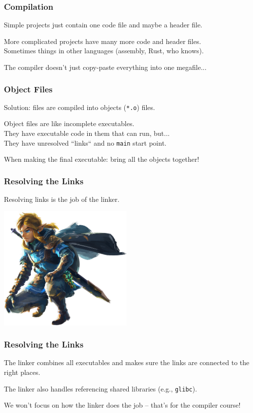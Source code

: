 \begin{frame}
\frametitle{Compilation}

Simple projects just contain one code file and maybe a header file.

More complicated projects have many more code and header files.\\
\quad Sometimes things in other languages (assembly, Rust, who knows).

The compiler doesn't just copy-paste everything into one megafile...

\end{frame}

\begin{frame}
\frametitle{Object Files}

Solution: files are compiled into objects (\texttt{*.o}) files.

Object files are like incomplete executables.\\
\quad They have executable code in them that can run, but...\\
\quad They have unresolved ``links`` and no \texttt{main} start point.

When making the final executable: bring all the objects together!

\end{frame}

\begin{frame}
\frametitle{Resolving the Links}

Resolving links is the job of the \alert{linker}.

\begin{center}
  \includegraphics[width=0.5\textwidth]{images/link.png}
\end{center}

\end{frame}

\begin{frame}
\frametitle{Resolving the Links}
The linker combines all executables and makes sure the links are connected to the right places.

The linker also handles referencing shared libraries (e.g., \texttt{glibc}).

We won't focus on how the linker does the job -- that's for the compiler course!

\end{frame}

